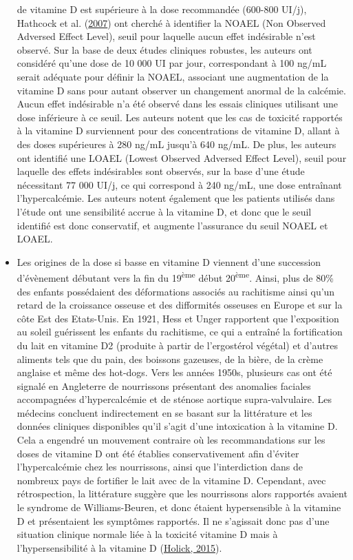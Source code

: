 \documentclass[
  letterpaper,
  DIV=11,
  numbers=noendperiod]{scrartcl}
\begin{document}
\begin{itemize}
  de vitamine D est supérieure à la dose recommandée (600-800 UI/j),
  Hathcock et al. (\protect\hyperlink{ref-Hathcock.20072gf}{2007}) ont
  cherché à identifier la NOAEL (Non Observed Adversed Effect Level),
  seuil pour laquelle aucun effet indésirable n'est observé. Sur la base
  de deux études cliniques robustes, les auteurs ont considéré qu'une
  dose de 10 000 UI par jour, correspondant à 100 ng/mL serait adéquate
  pour définir la NOAEL, associant une augmentation de la vitamine D
  sans pour autant observer un changement anormal de la calcémie. Aucun
  effet indésirable n'a été observé dans les essais cliniques utilisant
  une dose inférieure à ce seuil. Les auteurs notent que les cas de
  toxicité rapportés à la vitamine D surviennent pour des concentrations
  de vitamine D, allant à des doses supérieures à 280 ng/mL jusqu'à 640
  ng/mL. De plus, les auteurs ont identifié une LOAEL (Lowest Observed
  Adversed Effect Level), seuil pour laquelle des effets indésirables
  sont observés, sur la base d'une étude nécessitant 77 000 UI/j, ce qui
  correspond à 240 ng/mL, une dose entraînant l'hypercalcémie. Les
  auteurs notent également que les patients utilisés dans l'étude ont
  une sensibilité accrue à la vitamine D, et donc que le seuil identifié
  est donc conservatif, et augmente l'assurance du seuil NOAEL et LOAEL.
\item
  Les origines de la dose si basse en vitamine D viennent d'une
  succession d'évènement débutant vers la fin du 19\textsuperscript{ème}
  début 20\textsuperscript{ème}. Ainsi, plus de 80\% des enfants
  possédaient des déformations associés au rachitisme ainsi qu'un retard
  de la croissance osseuse et des difformités osseuses en Europe et sur
  la côte Est des Etats-Unis. En 1921, Hess et Unger rapportent que
  l'exposition au soleil guérissent les enfants du rachitisme, ce qui a
  entraîné la fortification du lait en vitamine D2 (produite à partir de
  l'ergostérol végétal) et d'autres aliments tels que du pain, des
  boissons gazeuses, de la bière, de la crème anglaise et même des
  hot-dogs. Vers les années 1950s, plusieurs cas ont été signalé en
  Angleterre de nourrissons présentant des anomalies faciales
  accompagnées d'hypercalcémie et de sténose aortique supra-valvulaire.
  Les médecins concluent indirectement en se basant sur la littérature
  et les données cliniques disponibles qu'il s'agit d'une intoxication à
  la vitamine D. Cela a engendré un mouvement contraire où les
  recommandations sur les doses de vitamine D ont été établies
  conservativement afin d'éviter l'hypercalcémie chez les nourrissons,
  ainsi que l'interdiction dans de nombreux pays de fortifier le lait
  avec de la vitamine D. Cependant, avec rétrospection, la littérature
  suggère que les nourrissons alors rapportés avaient le syndrome de
  Williams-Beuren, et donc étaient hypersensible à la vitamine D et
  présentaient les symptômes rapportés. Il ne s'agissait donc pas d'une
  situation clinique normale liée à la toxicité vitamine D mais à
  l'hypersensibilité à la vitamine D
  (\protect\hyperlink{ref-Holick.2015}{Holick, 2015}).
\end{itemize}
\end{document}
